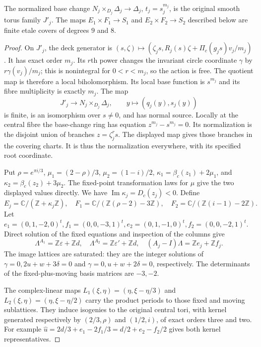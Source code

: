 \begin{proposition}\label{fam:src:A.1.2}\label{fam:st:A.1.2}
The normalized base change $N_j\times_{D_j}\Delta_j\to\Delta_j$, $t_j=s_j^{m_j}$, is the original smooth torus family $J'_j$. The maps $E_1\times F_1\to S_1$ and $E_2\times F_2\to S_2$ described below are finite etale covers of degrees $9$ and $8$.
\end{proposition}
\begin{proof}
On $J'_j$, the deck generator is
$(s,\zeta)\mapsto(\zeta_js,R_j(s)\zeta+\Pi_c(g_js)v_j/m_j)$. It has exact order $m_j$. Its $r$th power changes the invariant circle coordinate $\gamma$ by $r\gamma(v_j)/m_j$; this is nonintegral for $0<r<m_j$, so the action is free. The quotient map is therefore a local biholomorphism. Its local base function is $s^{m_j}$ and its fibre multiplicity is exactly $m_j$. The map
\[
 J'_j\longrightarrow N_j\times_{D_j}\Delta_j,\qquad y\longmapsto(q_j(y),s_j(y))
\]
is finite, is an isomorphism over $s\ne0$, and has normal source. Locally at the central fibre the base-change ring has equation $z^{m_j}-s^{m_j}=0$. Its normalization is the disjoint union of branches $z=\zeta_j^rs$. The displayed map gives those branches in the covering charts. It is thus the normalization everywhere, with its specified root coordinate.

Put $\rho=e^{\pi i/3}$, $\mu_1=(2-\rho)/3$, $\mu_2=(1-i)/2$, $\kappa_1=\beta_c(z_1)+2\mu_1$, and $\kappa_2=\beta_c(z_2)+3\mu_2$. The fixed-point transformation laws for $\mu$ give the two displayed values directly. We have $\operatorname{Im}\kappa_j=D_c(z_j)<0$. Define
\[
 E_j=\mathbb C/(\mathbb Z+\kappa_j\mathbb Z),\quad
 F_1=\mathbb C/(\mathbb Z(\rho-2)-3\mathbb Z),\quad
 F_2=\mathbb C/(\mathbb Z(i-1)-2\mathbb Z).
\]
Let $e_1=(0,1,-2,0)^t,f_1=(0,0,-3,1)^t,e_2=(0,1,-1,0)^t,f_2=(0,0,-2,1)^t$. Direct solution of the fixed equations and inspection of the columns give
\[
 \Lambda^{A_1}=\mathbb Z\varepsilon+\mathbb Zd,\quad
 \Lambda^{A_2}=\mathbb Z\varepsilon'+\mathbb Zd,\quad
 (A_j-I)\Lambda=\mathbb Ze_j+\mathbb Zf_j.
\]
The image lattices are saturated: they are the integer solutions of $\gamma=0,2u+w+3\delta=0$ and $\gamma=0,u+w+2\delta=0$, respectively. The determinants of the fixed-plus-moving basis matrices are $-3,-2$.

The complex-linear maps $L_1(\xi,\eta)=(\eta,\xi-\eta/3)$ and $L_2(\xi,\eta)=(\eta,\xi-\eta/2)$ carry the product periods to those fixed and moving sublattices. They induce isogenies to the original central tori, with kernel generated respectively by $(2/3,\rho)$ and $(1/2,i)$, of exact orders three and two. For example $\widehat u=2d/3+e_1-2f_1/3=d/2+e_2-f_2/2$ gives both kernel representatives.


\end{proof}
